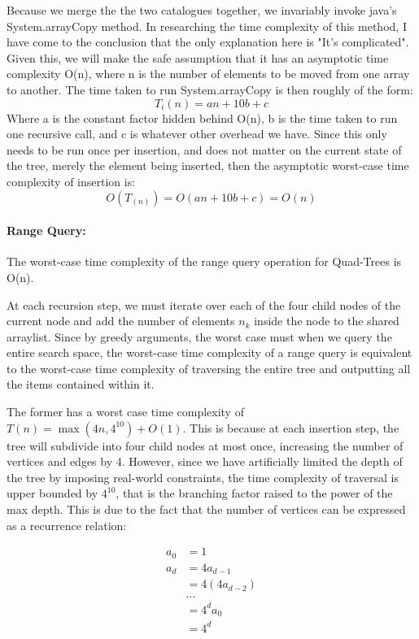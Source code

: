 \documentclass[12pt]{article}
\begin{document}
{Because we merge the the two catalogues together, we invariably invoke java's System.arrayCopy method. In researching the time complexity of this method, I have come to the conclusion that the only explanation here is "It's complicated". Given this, we will make the safe assumption that it has an asymptotic time complexity O(n), where n is the number of elements to be moved from one array to another. \newline
The time taken to run System.arrayCopy is then roughly of the form:
$$T_i(n) = an + 10b + c$$
Where a is the constant factor hidden behind O(n), b is the time taken to run one recursive call, and c is whatever other overhead we have. Since this only needs to be run once per insertion, and does not matter on the current state of the tree, merely the element being inserted, then the asymptotic worst-case time complexity of insertion is:
$$O(T_(n)) = O(an + 10b + c) = O(n)$$


\paragraph{Range Query:} 
The worst-case time complexity of the range query operation for Quad-Trees is O(n).

At each recursion step, we must iterate over each of the four child nodes of the current node and add the number of elements $n_k$ inside the node to the shared arraylist. Since by greedy arguments, the worst case must when we query the entire search space, the worst-case time complexity of a range query is equivalent to the worst-case time complexity of traversing the entire tree and outputting all the items contained within it. 

The former has a worst case time complexity of $T(n) = \max(4n, 4^{10}) + O(1)$. This is because at each insertion step, the tree will subdivide into four child nodes at most once, increasing the number of vertices and edges by 4. However, since we have artificially limited the depth of the tree by imposing real-world constraints, the time complexity of traversal is upper bounded by $4^{10}$, that is the branching factor raised to the power of the max depth. This is due to the fact that the number of vertices can be expressed as a recurrence relation:

\begin{align*}
a_0 & = 1 \\
a_d & = 4a_{d-1}\\
    & = 4(4a_{d-2}) \\
    & \ldots \\
    & = 4^da_0 \\
    & = 4^d \\
\end{align*}

}
\end{document}
